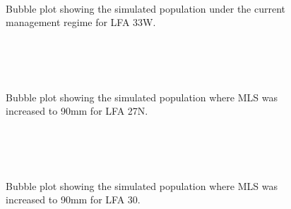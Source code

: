\documentclass[11pt]{article}
\newcommand{\e}{\string~/bio.data/bio.lobster/figures/LFA2733Framework2018/} %
\begin{document}
    \begin{figure}
    \centering
                \\
                \\
                \\
        
         \caption{Bubble plot showing the simulated population under the current management regime for LFA 33W.}
    \end{figure}
    


    \begin{figure}
    \centering
                \\
                \\
                \\
        
         \caption{Bubble plot showing the simulated population where MLS was increased to 90mm for LFA 27N.}
    \end{figure}
    
    \begin{figure}
    \centering
                \\
                \\
                \\
        
         \caption{Bubble plot showing the simulated population where MLS was increased to 90mm for LFA 30.}
    \end{figure}
    
\end{document}
